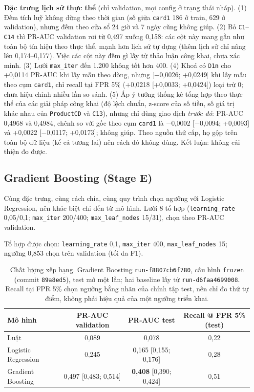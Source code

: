 \documentclass[11pt,a4paper]{article}
\newcommand{\code}[1]{\texttt{\small #1}}
\begin{document}
\begin{keypoint}
\textbf{Đặc trưng lịch sử thực thể} (chỉ validation, mọi config ở trạng thái nháp). (1) Đếm tích luỹ không dừng theo thời gian (số giữa \code{card1} 186 ở train, 629 ở validation), nhưng đếm theo cửa sổ 24 giờ và 7 ngày cũng không giúp. (2) Bỏ \code{C1}--\code{C14} thì PR-AUC validation rơi từ 0,497 xuống 0,158: các cột này mang gần như toàn bộ tín hiệu theo thực thể, mạnh hơn lịch sử tự dựng (thêm lịch sử chỉ nâng lên 0,174--0,177). Việc các cột này đếm gì lấy từ thảo luận công khai, chưa xác minh. (3) Lưới \code{max\_iter} đến 1.200 không tốt hơn 400. (4) Khoá có \code{D1n} cho +0,0114 PR-AUC khi lấy mẫu theo dòng, nhưng [$-$0,0026; +0,0249] khi lấy mẫu theo cụm \code{card1}, chỉ recall tại FPR 5\% (+0,0218 [+0,0033; +0,0424]) loại trừ 0; chưa hiệu chỉnh nhiều lần so sánh. (5) Áp ý tưởng thống kê tổng hợp theo thực thể của các giải pháp công khai (độ lệch chuẩn, z-score của số tiền, số giá trị khác nhau của \code{ProductCD} và \code{C13}), nhưng chỉ dùng giao dịch \emph{trước đó}: PR-AUC 0,4968 và 0,4984, chênh so với gốc theo cụm \code{card1} là $-$0,0002 [$-$0,0094; +0,0093] và +0,0022 [$-$0,0117; +0,0173]; không giúp. Theo nguồn thứ cấp, họ gộp trên toàn bộ dữ liệu (kể cả tương lai) nên cách đó không dùng. Kết luận: không cải thiện đo được.
\end{keypoint}

\subsection{Gradient Boosting (Stage E)}
Cùng đặc trưng, cùng cách chia, cùng quy trình chọn ngưỡng với Logistic Regression, nên khác biệt chỉ đến từ mô hình. Lưới 8 tổ hợp (\code{learning\_rate} 0,05/0,1; \code{max\_iter} 200/400; \code{max\_leaf\_nodes} 15/31), chọn theo PR-AUC validation.

Tổ hợp được chọn: \code{learning\_rate} 0,1, \code{max\_iter} 400, \code{max\_leaf\_nodes} 15; ngưỡng 0,853 chọn trên validation (tối đa F1).

\begin{table}[H]\centering
\caption{Chất lượng xếp hạng. Gradient Boosting \code{run-f8807cb6f780}, cấu hình \code{frozen} (commit \code{89a8ed5}), test mở một lần; hai baseline lấy từ \code{run-d6faa4699008}. Recall tại FPR 5\% chọn ngưỡng bằng nhãn của chính tập test, nên chỉ đo thứ tự điểm, không phải hiệu quả của một ngưỡng triển khai.}
\begin{tabular}{@{}lccc@{}}
\toprule
Mô hình & PR-AUC validation & PR-AUC test & Recall @ FPR 5\% (test) \\ \midrule
Luật & 0,089 & 0,078 & 0,22 \\
Logistic Regression & 0,245 & 0,165 [0,155; 0,176] & 0,28 \\
Gradient Boosting & 0,497 [0,483; 0,514] & \textbf{0,408} [0,390; 0,424] & 0,51 \\ \bottomrule
\end{tabular}
\end{table}
\end{document}
